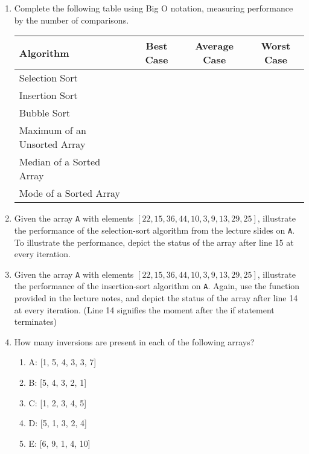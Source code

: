 \documentclass[11pt]{article}
\begin{document}
\begin{enumerate}[leftmargin=*]
    \pagebreak
    \item Complete the following table using Big O notation, measuring performance by the number of comparisons.
    \begin{center}
        \begin{tabular}{l | c | c | c }
            Algorithm & Best Case & Average Case & Worst Case \\ \hline
            Selection Sort & & & \\ \hline
            Insertion Sort & & & \\ \hline
            Bubble Sort & & & \\ \hline
            Maximum of an Unsorted Array & & & \\ \hline
            Median of a Sorted Array & & & \\ \hline
            Mode of a Sorted Array & & & \\ \hline
        \end{tabular}
    \end{center}
    
    \item Given the array \verb|A| with elements $[22, 15, 36, 44, 10, 3, 9, 13, 29, 25]$, illustrate the performance of the selection-sort algorithm from the lecture slides on \verb|A|. To illustrate the performance, depict the status of the array after line 15 at every iteration.
    
    \item Given the array \verb|A| with elements $[22, 15, 36, 44, 10, 3, 9, 13, 29, 25]$, illustrate the performance of the insertion-sort algorithm on \verb|A|. Again, use the function provided in the lecture notes, and depict the status of the array after line 14 at every iteration. (Line 14 signifies the moment after the if statement terminates)
    
    \item How many inversions are present in each of the following arrays?
    \begin{enumerate}
        \item[] A: [1, 5, 4, 3, 3, 7]
        \item[] B: [5, 4, 3, 2, 1]
        \item[] C: [1, 2, 3, 4, 5]
        \item[] D: [5, 1, 3, 2, 4]
        \item[] E: [6, 9, 1, 4, 10]
    \end{enumerate}
    
\end{enumerate}

\label{r:lastpage}
\end{document}
